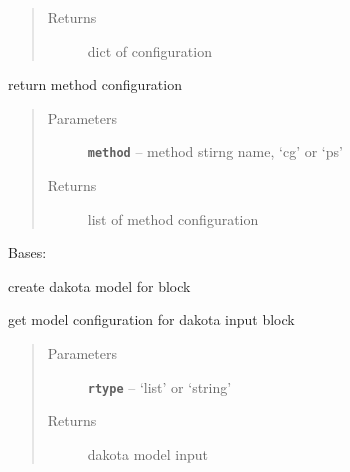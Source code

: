 \documentclass[letterpaper,10pt,english]{sphinxmanual}
\begin{document}
\begin{fulllineitems}
\begin{fulllineitems}
\begin{quote}
\begin{description}
\item[{Returns}] \leavevmode
dict of configuration

\end{description}\end{quote}

\end{fulllineitems}


\begin{fulllineitems}
\label{src/apidocs/dakutils:genopt.dakutils.DakotaMethod.method}
return method configuration
\begin{quote}\begin{description}
\item[{Parameters}] \leavevmode
\textbf{\texttt{method}} -- method stirng name, `cg' or `ps'

\item[{Returns}] \leavevmode
list of method configuration

\end{description}\end{quote}

\end{fulllineitems}


\end{fulllineitems}


\begin{fulllineitems}
\label{src/apidocs/dakutils:genopt.dakutils.DakotaModel}
Bases: \href{https://docs.python.org/2/library/functions.html\#object}{}

create dakota model for  block

\begin{fulllineitems}
\label{src/apidocs/dakutils:genopt.dakutils.DakotaModel.get_config}
get model configuration for dakota input block
\begin{quote}\begin{description}
\item[{Parameters}] \leavevmode
\textbf{\texttt{rtype}} -- `list' or `string'

\item[{Returns}] \leavevmode
dakota model input

\end{description}\end{quote}

\end{fulllineitems}


\end{fulllineitems}
\end{document}
